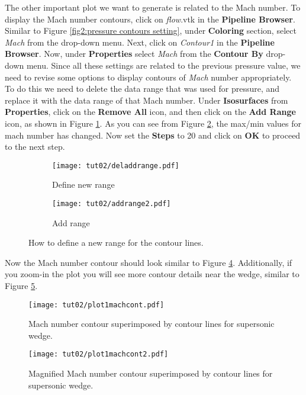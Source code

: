 The other important plot we want to generate is related to the Mach number. To display the Mach number contours, click on \textit{flow}.vtk in the \textbf{Pipeline Browser}. Similar to Figure \ref{fig2:pressure contours setting}, under \textbf{Coloring} section, select \textit{Mach} from the drop-down menu. Next, click on \textit{Contour1} in the \textbf{Pipeline Browser}. Now, under \textbf{Properties} select \textit{Mach} from the \textbf{Contour By} drop-down menu. Since all these settings are related to the previous pressure value, we need to revise some options to display contours of \textit{Mach} number appropriately. To do this we need to delete the data range that was used for pressure, and replace it with the data range of that Mach number. Under \textbf{Isosurfaces} from \textbf{Properties}, click on the \textbf{Remove All} icon, and then click on the \textbf{Add Range} icon, as shown in Figure \ref{fig2:contourby2 a}. As you can see from Figure \ref{fig2:contourby2 b}, the max/min values for mach number has changed. Now set the \textbf{Steps} to 20 and click on \textbf{OK} to proceed to the next step.
\begin{figure}[htbp]
    \centering
     \begin{subfigure}[b]{.4\textwidth}
         \centering
         \texttt{[image: tut02/deladdrange.pdf]}
         \caption{Define new range}
         \label{fig2:contourby2 a}
     \end{subfigure}
     \hfill
     \begin{subfigure}[b]{.4\textwidth}
         \centering
         \texttt{[image: tut02/addrange2.pdf]}
         \caption{Add range}
         \label{fig2:contourby2 b}
     \end{subfigure}     
    \caption{How to define a new range for the contour lines.}
    \label{fig2:contourby2}
\end{figure}
Now the Mach number contour should look similar to Figure \ref{fig2:mach_contour}. Additionally, if you zoom-in the plot you will see more contour details near the wedge, similar to Figure \ref{fig2:mach_contour_zoom}.
\begin{figure}[htbp]
    \centering
    \texttt{[image: tut02/plot1machcont.pdf]}
    \caption{Mach number contour superimposed by contour lines for supersonic wedge.}
    \label{fig2:mach_contour}
\end{figure}
\begin{figure}[htbp]
    \centering
    \texttt{[image: tut02/plot1machcont2.pdf]}
    \caption{Magnified Mach number contour superimposed by contour lines for supersonic wedge.}
    \label{fig2:mach_contour_zoom}
\end{figure}
